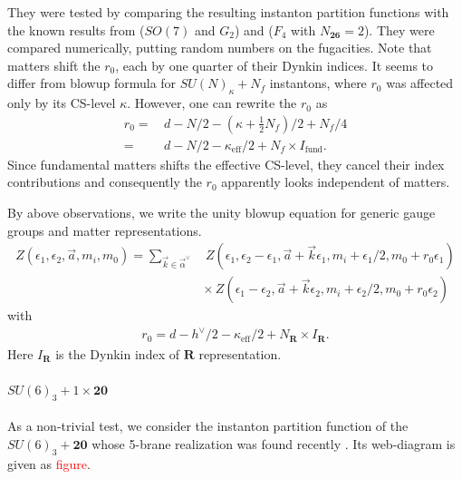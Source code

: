 \documentclass[letterpaper, 11pt]{article}
\begin{document}
They were tested by comparing the resulting instanton partition functions with the known results from \cite{Kim:2018gjo}($SO(7)$ and $G_2$) and \cite{DelZotto:2018tcj}($F_4$ with $N_{\boldsymbol{26}}=2$). They were compared numerically, putting random numbers on the fugacities.
Note that matters shift the $r_0$, each by one quarter of their Dynkin indices. It seems to differ from blowup formula for $SU(N)_\kappa+N_f$ instantons, where $r_0$ was affected only by its CS-level $\kappa$. However, one can rewrite the $r_0$ as
\begin{align}
r_0=&\,d-N/2-\left(\kappa+\frac{1}{2}N_f\right)/2+N_f/4\nonumber\\
=&\,d-N/2-\kappa_{\textrm{eff}}/2+N_f\times I_{\textrm{fund}}.
\end{align}
Since fundamental matters shifts the effective CS-level, they cancel their index contributions and consequently the $r_0$ apparently looks independent of matters. 

By above observations, we write the unity blowup equation for generic gauge groups and matter representations.
\begin{align}
Z(\epsilon_1,\epsilon_2,\vec{a},m_i,m_0)=\sum_{\vec{k}\in\vec{\alpha}^{\lor}}&\,Z(\epsilon_1,\epsilon_2-\epsilon_1,\vec{a}+\vec{k}\epsilon_1,m_i+\epsilon_1/2,m_0+r_0\epsilon_1)\nonumber\\
&\times\,Z(\epsilon_1-\epsilon_2,\vec{a}+\vec{k}\epsilon_2,m_i+\epsilon_2/2,m_0+r_0\epsilon_2)
\end{align}
with 
\begin{align}
r_0=d-h^{\lor}/2-\kappa_{\textrm{eff}}/2+N_{\boldsymbol{R}}\times I_{\boldsymbol{R}}.
\end{align}
Here $I_{\boldsymbol{R}}$ is the Dynkin index of $\boldsymbol{R}$ representation.

\paragraph{$SU(6)_3+1\times\boldsymbol{20}$}

As a non-trivial test, we consider the instanton partition function of the $SU(6)_3+\boldsymbol{20}$ whose 5-brane realization was found recently \cite{Hayashi:2019yxj}. Its web-diagram is given as \textcolor{red}{figure}.
\end{document}
